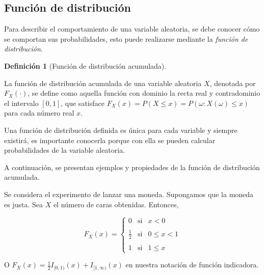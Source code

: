 \documentclass[
  us-letterpaper,
]{scrreprt}
\theoremstyle{plain}
\theoremstyle{definition}
\newtheorem{definition}{Definición}[chapter]
\theoremstyle{definition}
\theoremstyle{plain}
\theoremstyle{remark}
\begin{document}
\subsection{Función de
distribución}\label{funciuxf3n-de-distribuciuxf3n}

Para describir el comportamiento de una variable aleatoria, se debe
conocer cómo se comportan sus probabilidades, esto puede realizarse
mediante la \emph{función de distribución}.

\begin{definition}[Función de distribución
acumulada]\protect\hypertarget{def-fundist}{}\label{def-fundist}

La función de distribución acumulada de una variable aleatoria \(X\),
denotada por \(F_X(\cdot)\), se define como aquella función con dominio
la recta real y contradominio el intervalo \([0,1]\), que satisface
\(F_X(x)=P(X\leq x)=P({\omega: X(\omega)\leq x})\) para cada número real
\(x\).

\end{definition}

Una función de distribución definida es única para cada variable y
siempre existirá, es importante conocerla porque con ella se pueden
calcular probabilidades de la variable aleatoria.

A continuación, se presentan ejemplos y propiedades de la función de
distribución acumulada.

\begin{tcolorbox}[enhanced jigsaw, bottomtitle=1mm, coltitle=black, breakable, leftrule=.75mm, left=2mm, rightrule=.15mm, titlerule=0mm, toprule=.15mm, toptitle=1mm, colback=white, colframe=quarto-callout-caution-color-frame, title={Ejemplo}, colbacktitle=quarto-callout-caution-color!10!white, arc=.35mm, bottomrule=.15mm, opacitybacktitle=0.6, opacityback=0]

Se considera el experimento de lanzar una moneda. Supongamos que la
moneda es justa. Sea \(X\) el número de caras obtenidas. Entonces,

\[F_X(x)=\left\{ \begin{array}{lcc} 0 & \text{si} & x<0\\ \\ \frac{1}{2} & \text{si} & 0\leq x<1 \\ \\1 & \text{si} & 1\leq x \end{array} \right. \]

O \(F_X(x)=\frac{1}{2}I_{[0,1)}(x)+ I_{[1,\infty)}(x)\) en nuestra
notación de función indicadora.

\end{tcolorbox}
\end{document}
